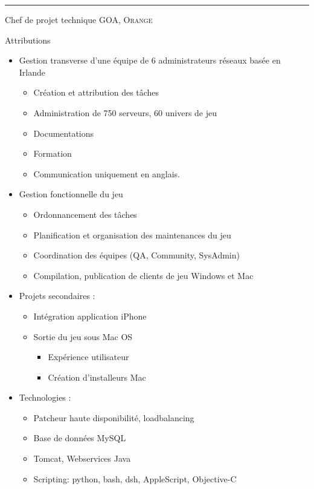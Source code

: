 \documentclass[a4paper,10pt]{article}
\begin{document}
\bigskip
\hrule
\bigskip
\newpage

\par{\centering\Large \hypertarget{mallyance}{Chef de projet technique \textsc{GOA, Orange}}\par}\large{\centering Attributions\par}\normalsize

\begin{itemize}
	\item Gestion transverse d’une équipe de 6 administrateurs réseaux basée en Irlande
	\begin{itemize}
		\item Création et attribution des tâches
		\item Administration de 750 serveurs, 60 univers de jeu
		\item Documentations
		\item Formation
		\item Communication uniquement en anglais.
	\end{itemize}
	\item Gestion fonctionnelle du jeu
	\begin{itemize}
		\item Ordonnancement des tâches
		\item Planification et organisation des maintenances du jeu
		\item Coordination des équipes (QA, Community, SysAdmin)
		\item Compilation, publication de clients de jeu Windows et Mac
	\end{itemize}
	\item Projets secondaires :
	\begin{itemize}
		\item Intégration application iPhone
		\item Sortie du jeu sous Mac OS
		\begin{itemize}
			\item Expérience utilisateur
			\item Création d’installeurs Mac
		\end{itemize}
	\end{itemize}
	\item Technologies :
	\begin{itemize}
		\item Patcheur haute disponibilité, loadbalancing
		\item Base de données MySQL
		\item Tomcat, Webservices Java
		\item Scripting: python, bash, dsh, AppleScript, Objective-C
	\end{itemize}
\end{itemize}
\end{document}
